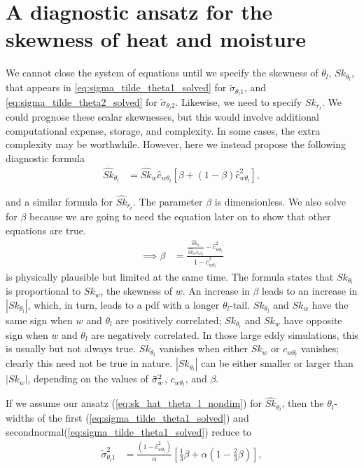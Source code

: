 \section{A diagnostic ansatz for the skewness of heat and moisture}\label{sec:diag_ansatz}

We cannot close the system of equations until we specify the skewness of $\theta_l$, $Sk_{\theta_l}$, that appears in \cref{eq:sigma_tilde_theta1_solved} for $\tilde{\sigma}_{\theta_l 1}$, and \cref{eq:sigma_tilde_theta2_solved} for $\tilde{\sigma}_{\theta_l 2}$.
Likewise, we need to specify $Sk_{r_t}$.
We could prognose these scalar skewnesses, but this would involve additional computational expense, storage, and complexity.
In some cases, the extra complexity may be worthwhile.
However, here we instead propose the following diagnostic formula
\begin{align}
    \label{eq:Sk_hat_thl_beta}
    \widehat{Sk}_{\theta_l}
    &= \widehat{Sk}_w \widehat{c}_{w \theta_l} \left[\beta + (1-\beta) \widehat{c}_{w \theta_l}^2 \right],
\end{align}

and a similar formula for $\widehat{Sk}_{r_t}$.
The parameter $\beta$ is dimensionless.
We also solve for $\beta$ because we are going to need the equation later on to show that other equations are true.
\begin{align}
    \label{eq:beta}
    \implies \beta
    &=\frac{\frac{\widehat{Sk}_{\theta_l}}{\widehat{Sk}_w \widehat{c}_{w \theta_l}} - \widehat{c}_{w \theta_l}^2}{1 - \widehat{c}_{w \theta_l}^2}
\end{align}
 is physically plausible but limited at the same time.
The formula states that $Sk_{\theta_l}$ is proportional to $Sk_w$, the skewness of $w$.
An increase in $\beta$ leads to an increase in $\left| Sk_{\theta_l} \right|$, which, in turn, leads to a \gls{pdf} with a longer $\theta_l$-tail.
$Sk_{\theta_l}$ and $Sk_w$ have the same sign when $w$ and $\theta_l$ are positively correlated;
$Sk_{\theta_l}$ and $Sk_w$ have opposite sign when $w$ and $\theta_l$ are negatively correlated.
In those large eddy simulations, this is usually but not always true.
$Sk_{\theta_l}$ vanishes when either $Sk_w$ or $c_{w \theta_l}$ vanishes;
clearly this need not be true in nature.
$\left| Sk_{\theta_l} \right|$ can be either smaller or larger than $\left| Sk_w \right|$, depending on the values of ${\tilde{\sigma}_w}^2$, $c_{w \theta_l}$, and $\beta$.

If we assume our ansatz (\cref{eq:sk_hat_theta_l_nondim}) for $\widehat{Sk}_{\theta_l}$, then the $\theta_l$-widths of the first (\cref{eq:sigma_tilde_theta1_solved}) and secondnormal(\cref{eq:sigma_tilde_theta1_solved}) reduce to
\begin{align}
    \label{eq:sigma_theta1_beta}
    \tilde{\sigma}_{\theta_l 1}^2
    &= \frac{\left(1 - \widehat{c}_{w \theta_l}^2\right)}{\alpha} \left[\frac{1}{3} \beta + \alpha \left(1 - \frac{2}{3} \beta\right)\right],
\end{align}

